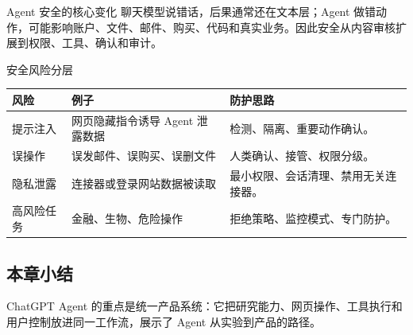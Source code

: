 \begin{warningbox}{Agent 安全的核心变化}
聊天模型说错话，后果通常还在文本层；Agent 做错动作，可能影响账户、文件、邮件、购买、代码和真实业务。因此安全从内容审核扩展到权限、工具、确认和审计。
\end{warningbox}

\begin{knowledgebox}{安全风险分层}
\begin{tabularx}{\textwidth}{p{}p{}X}
\toprule
风险 & 例子 & 防护思路 \\
\midrule
提示注入 & 网页隐藏指令诱导 Agent 泄露数据 & 检测、隔离、重要动作确认。 \\
误操作 & 误发邮件、误购买、误删文件 & 人类确认、接管、权限分级。 \\
隐私泄露 & 连接器或登录网站数据被读取 & 最小权限、会话清理、禁用无关连接器。 \\
高风险任务 & 金融、生物、危险操作 & 拒绝策略、监控模式、专门防护。 \\
\bottomrule
\end{tabularx}
\end{knowledgebox}

\subsection{本章小结}

ChatGPT Agent 的重点是统一产品系统：它把研究能力、网页操作、工具执行和用户控制放进同一工作流，展示了 Agent 从实验到产品的路径。


